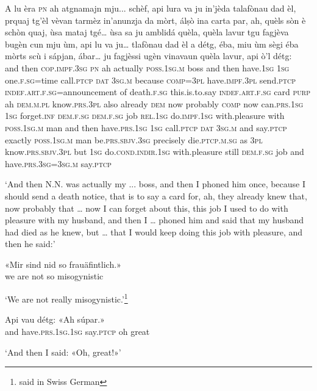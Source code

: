 \begin{linenumbers}
\gll  A lu èra \textsc{pn} ah atgnamajn mju... schèf, api lura va ju in’jèda talafònau dad èl, prquaj tg'èl vèvan tarmèz in’anunzja da mòrt, álṣò ina carta par, ah, quèls sòn è schòn quaj, ùsa mataj tgé… ùsa sa ju amblidá quèla, quèla lavur tgu fagjèva bugèn cun mju ùm, api lu va ju… tlafònau dad èl a détg, éba, miu ùm sègi éba mòrts scù i sápjan, ábar… ju fagjèssi ugèn vinavaun quèla lavur, api ò’l détg:  \\
and then \textsc{cop.impf.3sg} \textsc{pn} ah actually \textsc{poss.1sg.m} boss and then have.\textsc{1sg}  \textsc{1sg} one.\textsc{f.sg=}time call.\textsc{ptcp} \textsc{dat} \textsc{3sg.m} because \textsc{comp=3pl} have.\textsc{impf.3pl} send.\textsc{ptcp} \textsc{indef.art.f.sg=}announcement of death.\textsc{f.sg} this.is.to.say \textsc{indef.art.f.sg} card \textsc{purp} ah \textsc{dem.m.pl} know.\textsc{prs.3pl} also already \textsc{dem} now probably \textsc{comp} now can.\textsc{prs.1sg} \textsc{1sg} forget.\textsc{inf} \textsc{dem.f.sg} \textsc{dem.f.sg} job \textsc{rel.1sg} do.\textsc{impf.1sg} with.pleasure with \textsc{poss.1sg.m} man and then have.\textsc{prs.1sg} \textsc{1sg} call.\textsc{ptcp} \textsc{dat} \textsc{3sg.m} and say.\textsc{ptcp} exactly \textsc{poss.1sg.m} man be.\textsc{prs.sbjv.3sg} precisely die.\textsc{ptcp.m.sg} as \textsc{3pl} know.\textsc{prs.sbjv.3pl} but \textsc{1sg} do.\textsc{cond.indir.1sg} with.pleasure still \textsc{dem.f.sg} job and have.\textsc{prs.3sg=3sg.m} say.\textsc{ptcp}\\ 
\end{linenumbers}
\medskip
\glt `And then N.N. was actually my ... boss, and then I phoned him once, because I should send a death notice, that is to say a card for, ah, they already knew that, now probably that … now I can forget about this, this job I used to do with pleasure with my husband, and then I … phoned him and said that my husband had died as he knew, but … that I would keep doing this job with pleasure, and then he said:'
\medskip

\begin{linenumbers}
\gll  «Mir sind nid so frauäfintlich.»  \\
we are not so misogynistic  \\
\end{linenumbers}
\medskip
\glt `We are not really misogynistic.'\footnote{said in Swiss German}
\medskip

\begin{linenumbers}
\gll Api vau détg: «Ah súpar.»   \\
and have.\textsc{prs.1sg.1sg} say.\textsc{ptcp} oh great  \\
\end{linenumbers}
\medskip
\glt `And then I said: «Oh, great!»'
\medskip

